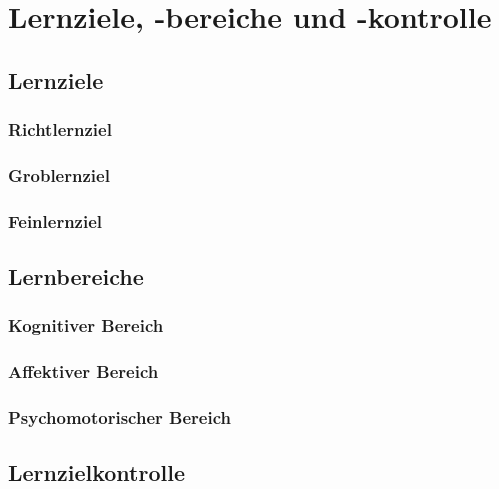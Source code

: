 \chapter{Lernziele, -bereiche und -kontrolle}

\section{Lernziele}

\subsection{Richtlernziel}

\subsection{Groblernziel}

\subsection{Feinlernziel}

\section{Lernbereiche}

\subsection{Kognitiver Bereich}

\subsection{Affektiver Bereich}

\subsection{Psychomotorischer Bereich}

\section{Lernzielkontrolle}


